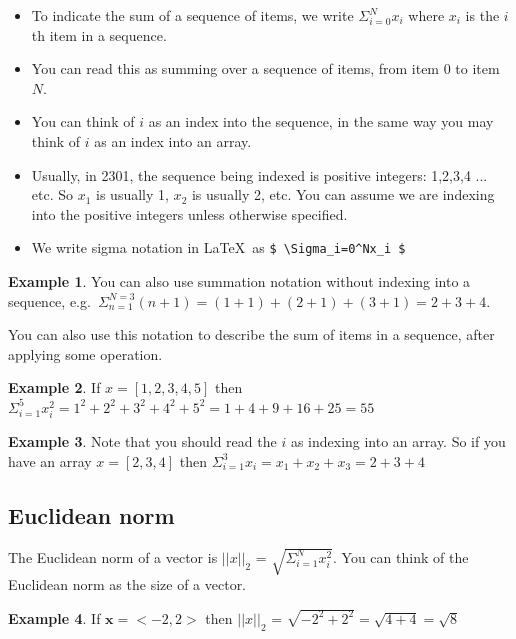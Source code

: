 \documentclass[]{article}
\theoremstyle{definition}
\newtheorem{exmp}{Example}[section]
\begin{document}
\begin{itemize}
\item To indicate the sum of a sequence of items, we write $\Sigma_{i=0}^Nx_i$ where $x_i$ is the $i$th item in a sequence. 
\item You can read this as summing over a sequence of items, from item 0 to item $N$. 
\item You can think of $i$ as an index into the sequence, in the same way you may think of $i$ as an index into an array. 
\item Usually, in 2301, the sequence being indexed is positive integers: 1,2,3,4 ... etc. So $x_1$ is usually 1, $x_2$ is usually 2, etc. You can assume we are indexing into the positive integers unless otherwise specified.
\item We write sigma notation in \LaTeX~as \verb|$ \Sigma_i=0^Nx_i $|
\end{itemize}

\begin{exmp}
You can also use summation notation without indexing into a sequence, e.g.\ $\Sigma_{n=1}^{N=3} (n+1) = (1+1) + (2+1) + (3 + 1) = 2 + 3 + 4$.
\end{exmp}

You can also use this notation to describe the sum of items in a sequence, after applying some operation.

\begin{exmp}
If $x=[1,2,3,4,5]$ then $\Sigma^5_{i=1} x_i^2 = 1^2 + 2^2 + 3^2 + 4^2 + 5^2 = 1 + 4 + 9 + 16 + 25 = 55$
\end{exmp}

\begin{exmp}
Note that you should read the $i$ as indexing into an array. So if you have an array $x=[2,3,4]$ then $\Sigma^3_{i=1} x_i = x_1 + x_2 + x_3 = 2 + 3 + 4$
\end{exmp}


\subsection{Euclidean norm}

The Euclidean norm of a vector is  $\vert \vert x \vert \vert_2$ = $\sqrt{\Sigma_{i=1}^{N} x_i ^2}$. You can think of the Euclidean norm as the size of a vector. 
\begin{exmp}
If $ \mathbf{x}=<-2,2> $ then  $\vert \vert x \vert \vert_2$ = $\sqrt{-2^2 + 2^2} = \sqrt{4 + 4}  = \sqrt{8}$  
\end{exmp}
\end{document}
